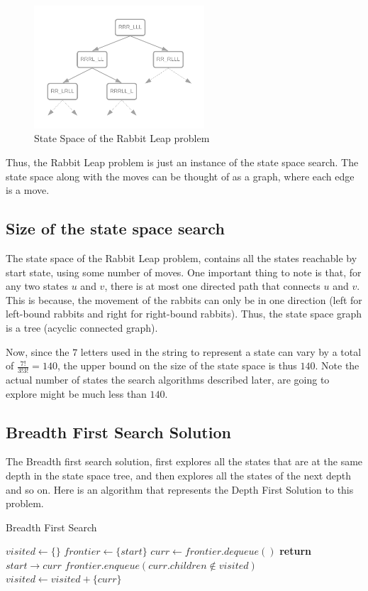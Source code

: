 \documentclass[journal, compsoc]{IEEEtran}
\begin{document}
\begin{figure}[!h]
\centering
\includegraphics[width=2.5in]{rabbitleap.png}
\caption{State Space of the Rabbit Leap problem}
\label{fig_sim}
\end{figure}

Thus, the Rabbit Leap problem is just an instance of the state space search. The state space along with the moves can be thought of as a graph,
where each edge is a move.

\subsection{Size of the state space search}

The state space of the Rabbit Leap problem, contains all the states reachable by start state, using some number of moves.
One important thing to note is that, for any two states $u$ and $v$, there is at most one directed path that connects $u$ and $v$.
This is because, the movement of the rabbits can only be in one direction (left for left-bound rabbits and right for right-bound rabbits).
Thus, the state space graph is a tree (acyclic connected graph).

Now, since the $7$ letters used in the string to represent a state can vary by a total of $\frac{7!}{3!3!} = 140$, the upper bound on the size of the state space is thus $140$.
Note the actual number of states the search algorithms described later, are going to explore might be much less than $140$.

\subsection{Breadth First Search Solution}

The Breadth first search solution, first explores all the states that are at the same depth in the state space tree,
and then explores all the states of the next depth and so on.
Here is an algorithm that represents the Depth First Solution to this problem.

\begin{algorithm}
\caption{Breadth First Search}\label{BFSrabbit}
\begin{algorithmic}[1]
\State $visited \gets \{\}$
\State $frontier \gets \{start\}$ 
\State $curr \gets frontier.dequeue()$
\State \textbf{return} $start \rightarrow curr$
\EndIf
\State $frontier.enqueue(curr.children \notin visited)$
\State $visited \gets visited + \{curr\}$
\EndWhile\label{bfsendwhile}
\EndProcedure
\end{algorithmic}
\end{algorithm}
\end{document}
